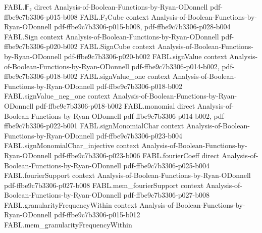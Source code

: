 \begin{theorem}
\label{FABL.naeFunctionTester_complete_signedDictator}
\leanok
{}
\proofstep
  {FABL.𝔽₂}
  {direct}
  {Analysis-of-Boolean-Functions-by-Ryan-ODonnell}
  {pdf-ffbe9c7b3306-p015-b008}
\proofstep
  {FABL.F₂Cube}
  {context}
  {Analysis-of-Boolean-Functions-by-Ryan-ODonnell}
  {pdf-ffbe9c7b3306-p015-b008,
    pdf-ffbe9c7b3306-p028-b004}
\proofstep
  {FABL.Sign}
  {context}
  {Analysis-of-Boolean-Functions-by-Ryan-ODonnell}
  {pdf-ffbe9c7b3306-p020-b002}
\proofstep
  {FABL.SignCube}
  {context}
  {Analysis-of-Boolean-Functions-by-Ryan-ODonnell}
  {pdf-ffbe9c7b3306-p020-b002}
\proofstep
  {FABL.signValue}
  {context}
  {Analysis-of-Boolean-Functions-by-Ryan-ODonnell}
  {pdf-ffbe9c7b3306-p014-b002,
    pdf-ffbe9c7b3306-p018-b002}
\proofstep
  {FABL.signValue_one}
  {context}
  {Analysis-of-Boolean-Functions-by-Ryan-ODonnell}
  {pdf-ffbe9c7b3306-p018-b002}
\proofstep
  {FABL.signValue_neg_one}
  {context}
  {Analysis-of-Boolean-Functions-by-Ryan-ODonnell}
  {pdf-ffbe9c7b3306-p018-b002}
\proofstep
  {FABL.monomial}
  {direct}
  {Analysis-of-Boolean-Functions-by-Ryan-ODonnell}
  {pdf-ffbe9c7b3306-p014-b002,
    pdf-ffbe9c7b3306-p022-b001}
\proofstep
  {FABL.signMonomialChar}
  {context}
  {Analysis-of-Boolean-Functions-by-Ryan-ODonnell}
  {pdf-ffbe9c7b3306-p023-b004}
\proofstep
  {FABL.signMonomialChar_injective}
  {context}
  {Analysis-of-Boolean-Functions-by-Ryan-ODonnell}
  {pdf-ffbe9c7b3306-p023-b006}
\proofstep
  {FABL.fourierCoeff}
  {direct}
  {Analysis-of-Boolean-Functions-by-Ryan-ODonnell}
  {pdf-ffbe9c7b3306-p025-b004}
\proofstep
  {FABL.fourierSupport}
  {context}
  {Analysis-of-Boolean-Functions-by-Ryan-ODonnell}
  {pdf-ffbe9c7b3306-p027-b008}
\proofstep
  {FABL.mem_fourierSupport}
  {context}
  {Analysis-of-Boolean-Functions-by-Ryan-ODonnell}
  {pdf-ffbe9c7b3306-p027-b008}
\proofstep
  {FABL.granularityFrequencyWithin}
  {context}
  {Analysis-of-Boolean-Functions-by-Ryan-ODonnell}
  {pdf-ffbe9c7b3306-p015-b012}
\proofstep
  {FABL.mem_granularityFrequencyWithin}

\end{theorem}
